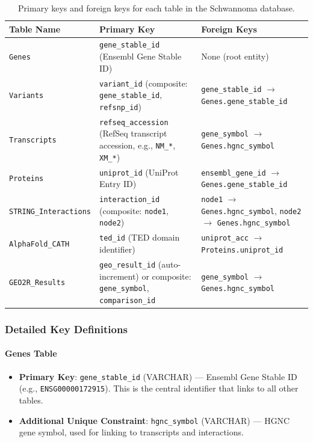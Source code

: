 \documentclass[11pt]{article}
\begin{document}
\begin{table}[H]
	\centering
	\small
	\begin{tabular}{p{3cm}p{4cm}p{6cm}}
		\toprule
		\textbf{Table Name} & \textbf{Primary Key} & \textbf{Foreign Keys} \\
		\midrule
		\texttt{Genes} & \texttt{gene\_stable\_id} (Ensembl Gene Stable ID) & None (root entity) \\
		\midrule
		\texttt{Variants} & \texttt{variant\_id} (composite: \texttt{gene\_stable\_id}, \texttt{refsnp\_id}) & \texttt{gene\_stable\_id} $\rightarrow$ \texttt{Genes.gene\_stable\_id} \\
		\midrule
		\texttt{Transcripts} & \texttt{refseq\_accession} (RefSeq transcript accession, e.g., \texttt{NM\_*}, \texttt{XM\_*}) & \texttt{gene\_symbol} $\rightarrow$ \texttt{Genes.hgnc\_symbol} \\
		\midrule
		\texttt{Proteins} & \texttt{uniprot\_id} (UniProt Entry ID) & \texttt{ensembl\_gene\_id} $\rightarrow$ \texttt{Genes.gene\_stable\_id} \\
		\midrule
		\texttt{STRING\_Interactions} & \texttt{interaction\_id} (composite: \texttt{node1}, \texttt{node2}) & \texttt{node1} $\rightarrow$ \texttt{Genes.hgnc\_symbol}, \texttt{node2} $\rightarrow$ \texttt{Genes.hgnc\_symbol} \\
		\midrule
		\texttt{AlphaFold\_CATH} & \texttt{ted\_id} (TED domain identifier) & \texttt{uniprot\_acc} $\rightarrow$ \texttt{Proteins.uniprot\_id} \\
		\midrule
		\texttt{GEO2R\_Results} & \texttt{geo\_result\_id} (auto-increment) or composite: \texttt{gene\_symbol}, \texttt{comparison\_id} & \texttt{gene\_symbol} $\rightarrow$ \texttt{Genes.hgnc\_symbol} \\
		\bottomrule
	\end{tabular}
	\caption{Primary keys and foreign keys for each table in the Schwannoma database.}
	\label{tab:keys}
\end{table}

\subsubsection{Detailed Key Definitions}

\paragraph{Genes Table}
\begin{itemize}
	\item \textbf{Primary Key}: \texttt{gene\_stable\_id} (VARCHAR) — Ensembl Gene Stable ID (e.g., \texttt{ENSG00000172915}). This is the central identifier that links to all other tables.
	\item \textbf{Additional Unique Constraint}: \texttt{hgnc\_symbol} (VARCHAR) — HGNC gene symbol, used for linking to transcripts and interactions.
\end{itemize}
\end{document}
